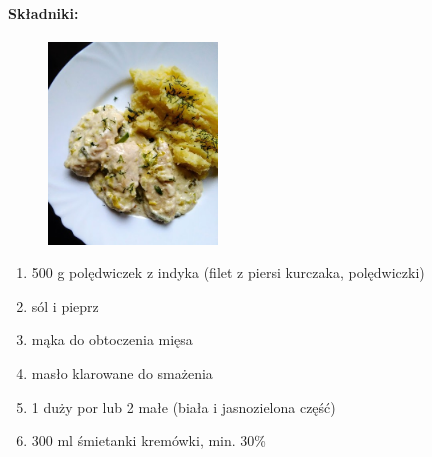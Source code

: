 \documentclass{article}
\begin{document}
    \paragraph{Składniki:}
    \begin{figure}
        \includegraphics[width=0.4\textwidth]{poledwiczki_z_indyka_w_sosie_porowo_smietanowym.jpg}
    \end{figure}
    \begin{enumerate}
        \item 500 g polędwiczek z indyka (filet z piersi kurczaka, polędwiczki)
        \item sól i pieprz
        \item mąka do obtoczenia mięsa
        \item masło klarowane do smażenia
        \item 1 duży por lub 2 małe (biała i jasnozielona część)
        \item 300 ml śmietanki kremówki, min. 30\%
    \end{enumerate}
\end{document}
